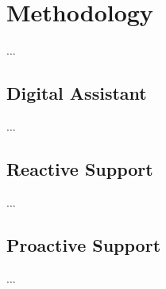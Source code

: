 \section{Methodology}\label{sec:Methodology}

...

\subsection{Digital Assistant}\label{sec:DA}

...

\subsection{Reactive Support} \label{sec:ReactiveSupport}

...

\subsection{Proactive Support}\label{sec:ProactiveSupport}

...
